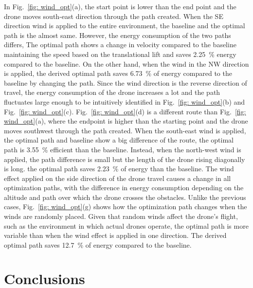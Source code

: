 \documentclass[journal]{./template/IEEEtran}
\begin{document}
In Fig.~\ref{fig: wind_opt}(a), the start point is lower than the end point and the drone moves south-east direction through the path created. 
When the SE direction wind is applied to the entire environment, the baseline and the optimal path is the almost same.
However, the energy consumption of the two paths differs, The optimal path shows a change in velocity compared to the baseline maintaining the speed based on the translational lift and saves 2.25~\% energy compared to the baseline.
On the other hand, when the wind in the NW direction is applied, the derived optimal path saves 6.73~\% of energy compared to the baseline by changing the path.
Since the wind direction is the reverse direction of travel, the energy consumption of the drone increases a lot and the path fluctuates large enough to be intuitively identified in Fig.~\ref{fig: wind_opt}(b) and Fig.~\ref{fig: wind_opt}(c).  
Fig.~\ref{fig: wind_opt}(d) is a different route than Fig.~\ref{fig: wind_opt}(a), where the endpoint is higher than the starting point and the drone moves southwest through the path created. When the south-east wind is applied, the optimal path and baseline show a big difference of the route, the optimal path is 3.55~\% efficient than the baseline.
Instead, when the north-west wind is applied, the path difference is small but the length of the drone rising diagonally is long. the optimal path saves 2.23~\% of energy than the baseline.
The wind effect applied on the side direction of the drone travel causes a change in all optimization paths, with the difference in energy consumption depending on the altitude and path over which the drone crosses the obstacles.
Unlike the previous cases, Fig.~\ref{fig: wind_opt}(g) shows how the optimization path changes when the winds are randomly placed.
Given that random winds affect the drone's flight, such as the environment in which actual drones operate, the optimal path is more variable than when the wind effect is applied in one direction.
The derived optimal path saves 12.7~\% of energy compared to the baseline.










\section{Conclusions}
\end{document}
